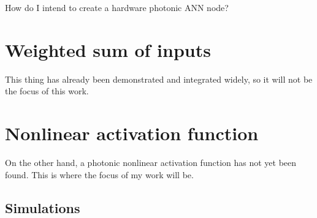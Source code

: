 How do I intend to create a hardware photonic ANN node?
\section{Weighted sum of inputs}
This thing has already been demonstrated and integrated widely, so it will not be the focus of this work.
\section{Nonlinear activation function}
On the other hand, a photonic nonlinear activation function has not yet been found.
This is where the focus of my work will be.

\subsection{Simulations}